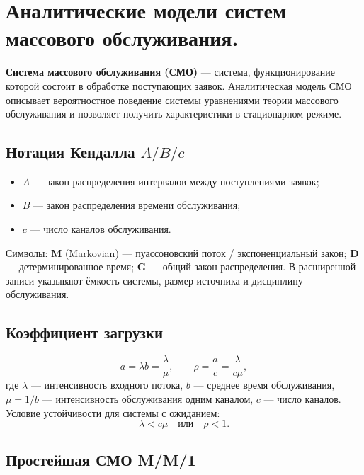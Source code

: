 \section{Аналитические модели систем массового обслуживания.}

\textbf{Система массового обслуживания (СМО)} — система, функционирование которой состоит в обработке поступающих заявок. Аналитическая модель СМО описывает вероятностное поведение системы уравнениями теории массового обслуживания и позволяет получить характеристики в стационарном режиме.

\subsection*{Нотация Кендалла $A/B/c$}

\begin{itemize}
  \item $A$ — закон распределения интервалов между поступлениями заявок;
  \item $B$ — закон распределения времени обслуживания;
  \item $c$ — число каналов обслуживания.
\end{itemize}

Символы: \textbf{M} (Markovian) — пуассоновский поток / экспоненциальный закон; \textbf{D} — детерминированное время; \textbf{G} — общий закон распределения. В расширенной записи указывают ёмкость системы, размер источника и дисциплину обслуживания.

\subsection*{Коэффициент загрузки}

\[
  a = \lambda b = \frac{\lambda}{\mu}, \qquad \rho = \frac{a}{c} = \frac{\lambda}{c\mu},
\]
где $\lambda$ — интенсивность входного потока, $b$ — среднее время обслуживания, $\mu=1/b$ — интенсивность обслуживания одним каналом, $c$ — число каналов. Условие устойчивости для системы с ожиданием:
\[
  \lambda < c\mu \quad \text{или} \quad \rho < 1.
\]

\subsection*{Простейшая СМО M/M/1}

